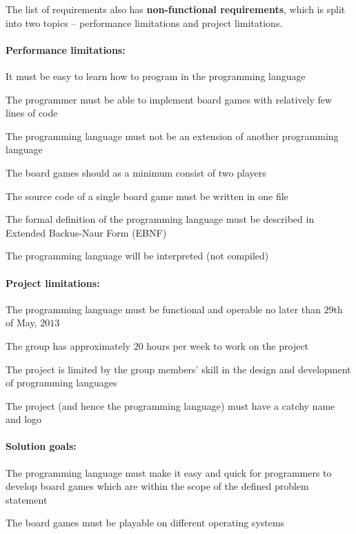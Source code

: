 The list of requirements also has \textbf{non-functional requirements}, which is
split into two topics -- performance limitations and project limitations.

\paragraph*{Performance limitations:}
\begin{nlist}
  \item It must be easy to learn how to program in the programming language
  \item The programmer must be able to implement board games with relatively few
    lines of code
  \item The programming language must not be an extension of another programming
    language
  \item The board games should as a minimum consist of two players
  \item The source code of a single board game must be written in one file
  \item The formal definition of the programming language must be described in
    Extended Backus-Naur Form (EBNF)
  \item The programming language will be interpreted (not compiled)
\end{nlist}

\paragraph*{Project limitations:}
\begin{nlist}
  \item The programming language must be functional and operable no later than
    $29$th of May, $2013$
  \item The group has approximately $20$ hours per week to work on the project
  \item The project is limited by the group members' skill in the design and
    development of programming languages
  \item The project (and hence the programming language) must have a catchy name
    and logo
\end{nlist}

\paragraph*{Solution goals:}
\begin{nlist}
  \item The programming language must make it easy and quick for programmers to
    develop board games which are within the scope of the defined problem
    statement
  \item The board games must be playable on different operating systems
\end{nlist}


